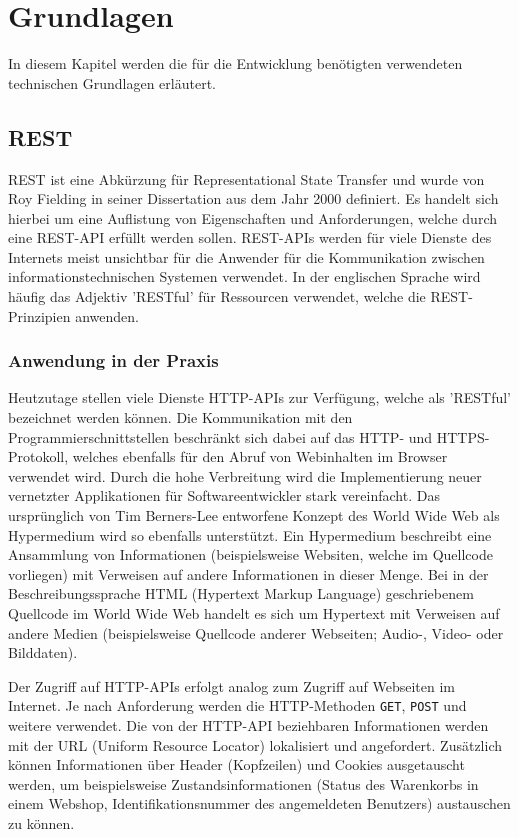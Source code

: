 \chapter{Grundlagen}

In diesem Kapitel werden die für die Entwicklung benötigten verwendeten technischen Grundlagen erläutert.

\section{REST}

REST ist eine Abkürzung für Representational State Transfer und wurde von Roy Fielding in seiner Dissertation aus dem Jahr 2000 \cite{rest} definiert. Es handelt sich hierbei um eine Auflistung von Eigenschaften und Anforderungen, welche durch eine REST-API erfüllt werden sollen. REST-APIs werden für viele Dienste des Internets meist unsichtbar für die Anwender für die Kommunikation zwischen informationstechnischen Systemen verwendet. In der englischen Sprache wird häufig das Adjektiv 'RESTful' für Ressourcen verwendet, welche die REST-Prinzipien anwenden.

\subsection{Anwendung in der Praxis}

Heutzutage stellen viele Dienste HTTP-APIs zur Verfügung, welche als 'RESTful' bezeichnet werden können. Die Kommunikation mit den Programmierschnittstellen beschränkt sich dabei auf das HTTP- und HTTPS-Protokoll, welches ebenfalls für den Abruf von Webinhalten im Browser verwendet wird. Durch die hohe Verbreitung wird die Implementierung neuer vernetzter Applikationen für Softwareentwickler stark vereinfacht. Das ursprünglich von Tim Berners-Lee entworfene Konzept des World Wide Web als Hypermedium wird so ebenfalls unterstützt. Ein Hypermedium beschreibt eine Ansammlung von Informationen (beispielsweise Websiten, welche im Quellcode vorliegen) mit Verweisen auf andere Informationen in dieser Menge. Bei in der Beschreibungssprache HTML (Hypertext Markup Language) geschriebenem Quellcode im World Wide Web handelt es sich um Hypertext mit Verweisen auf andere Medien (beispielsweise Quellcode anderer Webseiten; Audio-, Video- oder Bilddaten). 

Der Zugriff auf HTTP-APIs erfolgt analog zum Zugriff auf Webseiten im Internet. Je nach Anforderung werden die HTTP-Methoden \lstinline{GET}, \lstinline{POST} und weitere verwendet. Die von der HTTP-API beziehbaren Informationen werden mit der URL (Uniform Resource Locator) lokalisiert und angefordert. Zusätzlich können Informationen über Header (Kopfzeilen) und Cookies ausgetauscht werden, um beispielsweise Zustandsinformationen (Status des Warenkorbs in einem Webshop, Identifikationsnummer des angemeldeten Benutzers) austauschen zu können.

